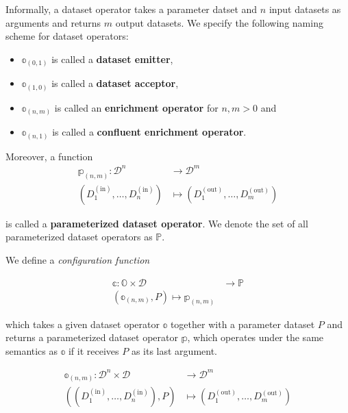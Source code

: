 Informally, a dataset operator takes a parameter datset and $n$ input datasets as arguments and returns $m$ output datasets. We specify the following naming scheme for dataset operators:
\begin{itemize}
  \item $\mathbb{o}_{(0,1)}$ is called a \textbf{dataset emitter},
  \item $\mathbb{o}_{(1,0)}$ is called a \textbf{dataset acceptor},
  \item $\mathbb{o}_{(n,m)}$ is called an \textbf{enrichment operator} for $n,m>0$ and
  \item $\mathbb{o}_{(n,1)}$ is called a \textbf{confluent enrichment operator}.
\end{itemize}

Moreover, a function
\begin{equation}
\begin{aligned}
\mathbb{p}_{(n,m)}\colon \mathcal{D}^n &\to \mathcal{D}^m \\
\left(D_{1}^{(\text{in})}, \dots, D_{n}^{(\text{in})}\right) & \mapsto \left( D_{1}^{(\text{out})}, \dots, D_{m}^{(\text{out})} \right)
\end{aligned}
\end{equation}

is called a \textbf{parameterized dataset operator}. We denote the set of all parameterized dataset operators as $\mathbb{P}$.

We define a \emph{configuration function} 

\begin{equation}
\begin{aligned}
\mathbb{c}\colon \mathbb{O} \times \mathcal{D} &\to \mathbb{P} \\
 \left( \mathbb{o}_{(n,m)}, P \right) \mapsto \mathbb{p}_{(n,m)}
\end{aligned}
\label{eq:cfg}
\end{equation}

which takes a given dataset operator $\mathbb{o}$ together with a parameter dataset $P$ and returns a parameterized dataset operator $\mathbb{p}$, which operates under the same semantics as $\mathbb{o}$ if it receives $P$ as its last argument.

\begin{align*}
\mathbb{o}_{(n,m)}\colon \mathcal{D}^n \times  \mathcal{D}  &\to \mathcal{D}^m \\
\left(\left(D_{1}^{(\text{in})}, \dots, D_{n}^{(\text{in})}\right), P\right) & \mapsto \left( D_{1}^{(\text{out})}, \dots, D_{m}^{(\text{out})} \right)
\end{align*}

